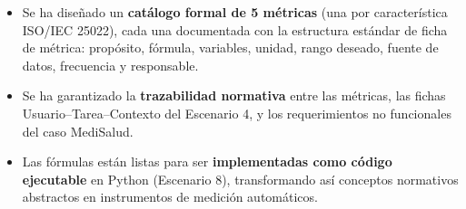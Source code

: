 \documentclass[12pt,a4paper]{article}
\begin{document}
\begin{tcolorbox}[colback=green!5, colframe=green!50!black, title=Resultado obtenido]
\begin{itemize}
    \item Se ha dise\~nado un \textbf{cat\'alogo formal de 5 m\'etricas} (una por caracter\'istica ISO/IEC 25022), cada una documentada con la estructura est\'andar de ficha de m\'etrica: prop\'osito, f\'ormula, variables, unidad, rango deseado, fuente de datos, frecuencia y responsable.
    \item Se ha garantizado la \textbf{trazabilidad normativa} entre las m\'etricas, las fichas Usuario--Tarea--Contexto del Escenario 4, y los requerimientos no funcionales del caso MediSalud.
    \item Las f\'ormulas est\'an listas para ser \textbf{implementadas como c\'odigo ejecutable} en Python (Escenario 8), transformando as\'i conceptos normativos abstractos en instrumentos de medici\'on autom\'aticos.
\end{itemize}
\end{tcolorbox}
\end{document}
